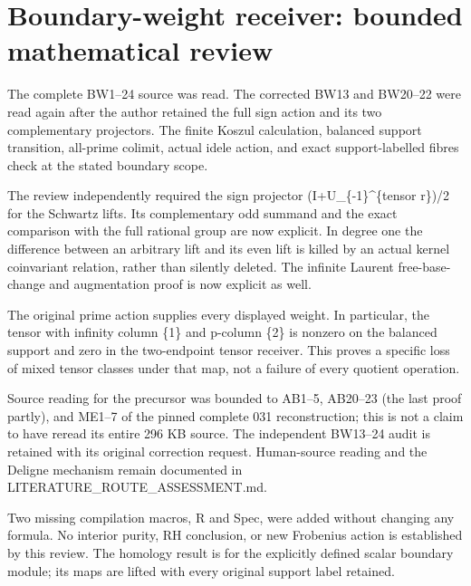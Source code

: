 \documentclass[
]{article}
\author{}
\date{}
\begin{document}
\section{Boundary-weight receiver: bounded mathematical
review}\label{boundary-weight-receiver-bounded-mathematical-review}

The complete BW1--24 source was read. The corrected BW13 and BW20--22
were read again after the author retained the full sign action and its
two complementary projectors. The finite Koszul calculation, balanced
support transition, all-prime colimit, actual idele action, and exact
support-labelled fibres check at the stated boundary scope.

The review independently required the sign projector
(I+U\_\{-1\}\^{}\{tensor r\})/2 for the Schwartz lifts. Its
complementary odd summand and the exact comparison with the full
rational group are now explicit. In degree one the difference between an
arbitrary lift and its even lift is killed by an actual kernel
coinvariant relation, rather than silently deleted. The infinite Laurent
free-base-change and augmentation proof is now explicit as well.

The original prime action supplies every displayed weight. In
particular, the tensor with infinity column \{1\} and p-column \{2\} is
nonzero on the balanced support and zero in the two-endpoint tensor
receiver. This proves a specific loss of mixed tensor classes under that
map, not a failure of every quotient operation.

Source reading for the precursor was bounded to AB1--5, AB20--23 (the
last proof partly), and ME1--7 of the pinned complete 031
reconstruction; this is not a claim to have reread its entire 296 KB
source. The independent BW13--24 audit is retained with its original
correction request. Human-source reading and the Deligne mechanism
remain documented in LITERATURE\_ROUTE\_ASSESSMENT.md.

Two missing compilation macros, R and Spec, were added without changing
any formula. No interior purity, RH conclusion, or new Frobenius action
is established by this review. The homology result is for the explicitly
defined scalar boundary module; its maps are lifted with every original
support label retained.
\end{document}

